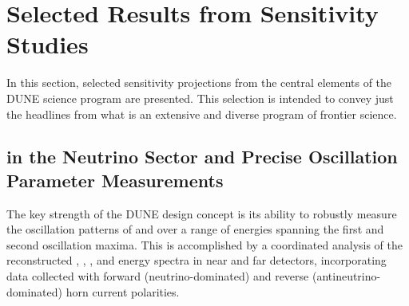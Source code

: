 \section{Selected Results from Sensitivity Studies}
\label{sec:exec-phys-sensitiv-results}

In this section, selected sensitivity projections from the 
central elements of the DUNE science program are presented.  
This selection is intended to convey just the headlines from 
what is an extensive and diverse program of frontier science.

\subsection{ in the Neutrino 
Sector and Precise Oscillation Parameter Measurements}
\label{sec:es:phys:cpv}

The key strength of the DUNE design concept is its ability to 
robustly measure the oscillation patterns of \numu and \anumu 
over a range of energies spanning the first and second 
oscillation maxima. 
This is accomplished by a coordinated analysis of the 
reconstructed \numu, \anumu, \nue, and \anue energy spectra 
in near and far detectors, 
incorporating data collected with forward (neutrino-dominated) 
and reverse (antineutrino-dominated) horn current polarities.  

